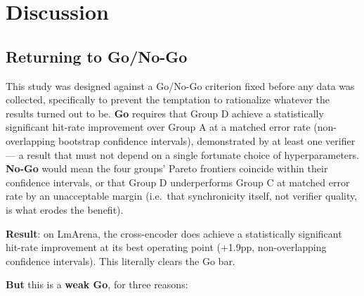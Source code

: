 \documentclass[11pt]{article}
\begin{document}
\section{Discussion}

\subsection{Returning to Go/No-Go}
\label{sec:golo}

This study was designed against a Go/No-Go criterion fixed before any data was collected, specifically to prevent the temptation to rationalize whatever the results turned out to be. \textbf{Go} requires that Group D achieve a statistically significant hit-rate improvement over Group A at a matched error rate (non-overlapping bootstrap confidence intervals), demonstrated by at least one verifier --- a result that must not depend on a single fortunate choice of hyperparameters. \textbf{No-Go} would mean the four groups' Pareto frontiers coincide within their confidence intervals, or that Group D underperforms Group C at matched error rate by an unacceptable margin (i.e.\ that synchronicity itself, not verifier quality, is what erodes the benefit).

\textbf{Result}: on LmArena, the cross-encoder does achieve a statistically significant hit-rate improvement at its best operating point (+1.9pp, non-overlapping confidence intervals). This literally clears the Go bar.

\textbf{But} this is a \textbf{weak Go}, for three reasons:
\end{document}
